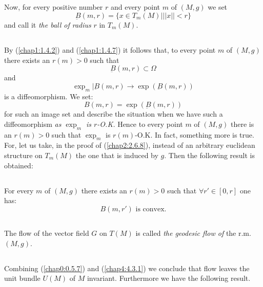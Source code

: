 \setcounter{subsection}{4}
\subsection{}\label{chap4:4.3.5}
Now, for every positive number $r$ and every point $m$ of $(M,g)$ we
set
$$
\underbar{B}(m,r)=\{x\in T_{m}(M)\big| ||x||<r\}
$$
and call it {\em the ball of radius} $r$ in $T_{m}(M)$.

\subsection{}\label{chap4:4.3.6}
By (\ref{chap1:1.4.2}) and (\ref{chap1:1.4.7}) it follows that, to every point $m$
of $(M,g)$ there exists an $r(m)>0$ such that
$$
\underbar{B}(m,r)\subset\Omega
$$
and\pageoriginale
$$
\exp_{m}|\underbar{B}(m,r)\to \exp(\underbar{B}(m,r))
$$
is a diffeomorphism. We set:
$$
B(m,r)=\exp(\underbar{B}(m,r))
$$
for such an image set and describe the situation when we have such a
diffeomorphism {\em as $\exp_{m}$ is $r$-O.K.} Hence to every point
$m$ of $(M,g)$ there is an $r(m)>0$ such that $\exp_{m}$ is
$r(m)$-O.K. In fact, something more is true. For, let us take, in the
proof of (\ref{chap2:2.6.8}), instead of an arbitrary euclidean structure
on $T_{m}(M)$ the one that is induced by $g$. Then the following
result is obtained:

\setcounter{subsection}{6}
\subsection{}\label{chap4:4.3.7}
For every $m$ of $(M,g)$ there exists an $r(m)>0$ such that $\forall
r'\in [0,r]$ one has:
$$
B(m,r')\text{ \  is convex.}
$$

\subsection{}\label{chap4:defi4.3.8}

\begin{defi*}
The flow of the vector field $G$ on $T(M)$ is called {\em the geodesic
  flow of} the r.m.\@ $(M,g)$.
\end{defi*}

\subsection{}\label{chap4:4.3.9}

\begin{remark*}
Combining (\ref{chap0:0.5.7}) and (\ref{chap4:4.3.1}) we conclude that
flow leaves the unit bundle $U(M)$ of $M$ invariant. Furthermore we
have the following result.
\end{remark*}

